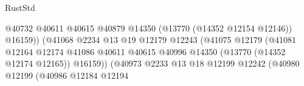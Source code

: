 \begin{lexlean}{RustStd}
\begin{coremodule}
                                                                @40732
                                                                @40611
                                                                @40615
                                                                @40879
                                                                @14350
                                                                (@13770 (@14352 @12154 @12146))
                                                                @16159))
                                                            (@41068
                                                              @2234
                                                              @13
                                                              @19
                                                              @12179
                                                              @12243
                                                              (@41075
                                                                @12179
                                                                (@41081
                                                                  @12164
                                                                  @12174
                                                                  @41086
                                                                  @40611
                                                                  @40615
                                                                  @40996
                                                                  @14350
                                                                  (@13770 (@14352 @12174 @12165))
                                                                  @16159))
                                                              (@40973
                                                                @2233
                                                                @13
                                                                @18
                                                                @12199
                                                                @12242
                                                                (@40980
                                                                  @12199
                                                                  (@40986
                                                                    @12184
                                                                    @12194

\end{coremodule}
\end{lexlean}

